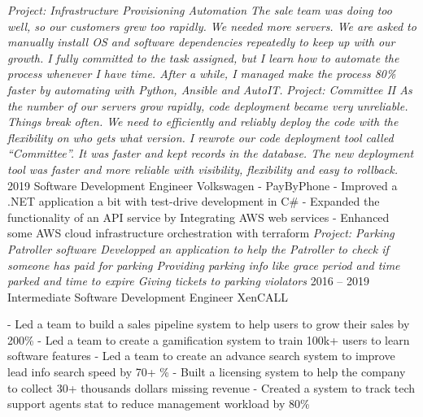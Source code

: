 \documentclass[9pt]{developercv} %
\begin{document}
\begin{entrylist}
{            \textit{Project: Infrastructure Provisioning Automation\newline
            The sale team was doing too well, so our customers grew too rapidly. We needed more servers.  
            We are asked to manually install OS and software dependencies repeatedly to keep up with our growth. I fully committed to the task assigned, but I learn how to automate the process whenever I have time. After a while, I managed make the process 80\% faster by automating with Python, Ansible and AutoIT.\newline\newline}
            \textit{Project: Committee II\newline
            As the number of our servers grow rapidly, code deployment became very unreliable. Things break often. We need to efficiently and reliably deploy the code with the flexibility on who gets what version. I rewrote our code deployment tool called “Committee”. It was faster and kept records in the database. The new deployment tool was faster and more reliable with visibility, flexibility and easy to rollback.\newline}
        }
		\entry
		{2019}
		{Software Development Engineer}
		{Volkswagen - PayByPhone}
		{
            - Improved a .NET application a bit with test-drive development in C\#\newline
            - Expanded the functionality of an API service by Integrating AWS web services\newline 
            - Enhanced some AWS cloud infrastructure orchestration with terraform\newline\newline
			\textit{Project: Parking Patroller software\newline
            Developped an application to help the Patroller to check if someone has paid for parking
            Providing parking info like grace period and time parked and time to expire
            Giving tickets to parking violators \newline}
        }
	\entry
		{2016 -- 2019}
		{Intermediate Software Development Engineer}
		{XenCALL}
		{
            - Led a team to build a sales pipeline system to help users to grow their sales by 200\%\newline
            - Led a team to create a gamification system to train 100k+ users to learn software features\newline
            - Led a team to create an advance search system to improve lead info search speed by 70+ \%\newline
            - Built a licensing system to help the company to collect 30+ thousands dollars missing revenue\newline
            - Created a system to track tech support agents stat to reduce management workload by 80\%\newline

}
\end{entrylist}
\end{document}
